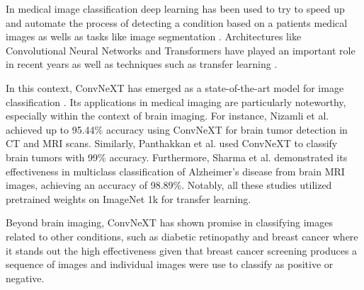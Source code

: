 In medical image classification deep learning has been used to try to speed up and automate the process of detecting a condition based on a patients medical images as wells as tasks like image segmentation \cite{dlmedicalimages}. Architectures like Convolutional Neural Networks and Transformers have played an important role in recent years as well as techniques such as transfer learning \cite{dlmedicalimages}.

In this context, ConvNeXT has emerged as a state-of-the-art model for image classification \cite{convnextbro}. Its applications in medical imaging are particularly noteworthy, especially within the context of brain imaging.  For instance, Nizamli et al. \cite{nizamli_accurate_2024} achieved up to 95.44\% accuracy using ConvNeXT for brain tumor detection in CT and MRI scans. Similarly, Panthakkan et al. \cite{panthakkan_unleashing_2023} used ConvNeXT to classify brain tumors with 99\% accuracy.  Furthermore, Sharma et al. \cite{sharma_neurospectra_2023}  demonstrated its effectiveness in multiclass classification of Alzheimer's disease from brain MRI images, achieving an accuracy of 98.89\%. Notably, all these studies utilized pretrained weights on ImageNet 1k for transfer learning. 

Beyond brain imaging, ConvNeXT has shown promise in classifying images related to other conditions, such as diabetic retinopathy \cite{devanshi_early_2023} and breast cancer \cite{reddy_enhancing_2024} where it stands out the high effectiveness given that breast cancer screening produces a sequence of images and individual images were use to classify as positive or negative.